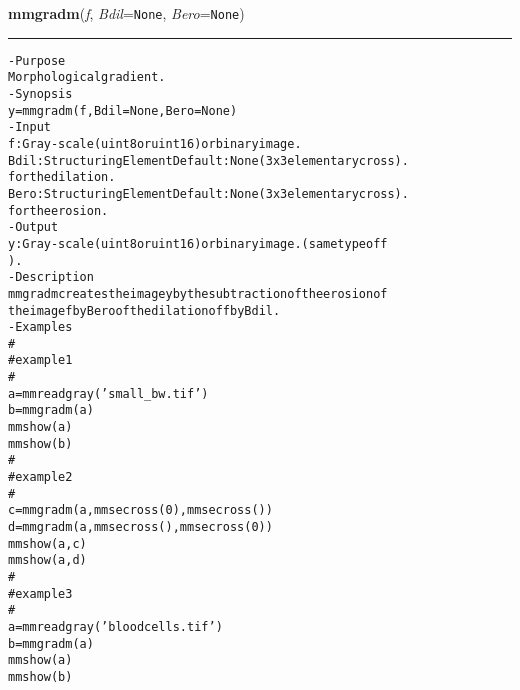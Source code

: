     \label{multireg:num_pymorph:mmgradm}
    \vspace{0.5ex}

    \begin{boxedminipage}{\textwidth}

    \raggedright \textbf{mmgradm}(\textit{f}, \textit{Bdil}=\texttt{N\-o\-n\-e\-}, \textit{Bero}=\texttt{N\-o\-n\-e\-})

    \vspace{-1.5ex}

    \rule{\textwidth}{0.5\fboxrule}
\begin{alltt}
- Purpose
    Morphological gradient.
- Synopsis
    y = mmgradm(f, Bdil=None, Bero=None)
- Input
    f:    Gray-scale (uint8 or uint16) or binary image.
    Bdil: Structuring Element Default: None (3x3 elementary cross).
          for the dilation.
    Bero: Structuring Element Default: None (3x3 elementary cross).
          for the erosion.
- Output
    y: Gray-scale (uint8 or uint16) or binary image. (same type of f
       ).
- Description
    mmgradm creates the image y by the subtraction of the erosion of
    the image f by Bero of the dilation of f by Bdil .
- Examples
    \#
    \#   example 1
    \#
    a = mmreadgray('small\_bw.tif')
    b = mmgradm(a)
    mmshow(a)
    mmshow(b)
    \#
    \#   example 2
    \#
    c=mmgradm(a,mmsecross(0),mmsecross())
    d=mmgradm(a,mmsecross(),mmsecross(0))
    mmshow(a,c)
    mmshow(a,d)
    \#
    \#   example 3
    \#
    a = mmreadgray('bloodcells.tif')
    b = mmgradm(a)
    mmshow(a)
    mmshow(b)\end{alltt}

    \vspace{1ex}

    \end{boxedminipage}

    \label{multireg:num_pymorph:mmgrain}
    \vspace{0.5ex}

